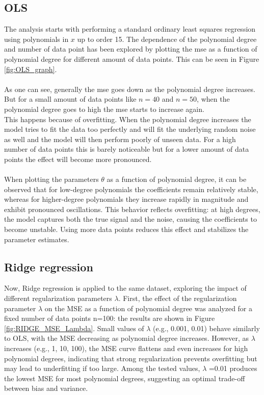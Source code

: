 \documentclass[
 reprint,            %
 amsmath,amssymb,
 aps,
]{revtex4-2}
\begin{document}
\subsection{OLS}
\label{OLS}
The analysis starts with performing a standard ordinary least squares regression using polynomials in $x$ up to order 15. The dependence of the polynomial degree and number of data point has been explored by plotting the mse as a function of polynomial degree for different amount of data points. This can be seen in Figure \ref{fig:OLS_graph}.\\\\
As one can see, generally the mse goes down as the polynomial degree increases. But for a small amount of data points like $n = 40$ and $n = 50$, when the polynomial degree goes to high the mse starts to increase again.\\
This happens because of overfitting. When the polynomial degree increases the model tries to fit the data too perfectly and will fit the underlying random noise as well and the model will then perform poorly of unseen data. For a high number of data points this is barely noticeable but for a lower amount of data points the effect will become more pronounced.\\\\
When plotting the parameters $\theta$ as a function of polynomial degree, it can be observed that for low-degree polynomials the coefficients remain relatively stable, whereas for higher-degree polynomials they increase rapidly in magnitude and exhibit pronounced oscillations.
This behavior reflects overfitting: at high degrees, the model captures both the true signal and the noise, causing the coefficients to become unstable. Using more data points reduces this effect and stabilizes the parameter estimates.
    


\subsection{Ridge regression}
\label{Ridge regression}
Now, Ridge regression is applied to the same dataset, exploring the impact of different regularization parameters $\lambda$. First, the effect of the regularization parameter $\lambda $ on the MSE as a function of polynomial degree was analyzed for a fixed number of data points n=100: the results are shown in Figure \ref{fig:RIDGE_MSE_Lambda}.
Small values of $\lambda$ (e.g., 0.001, 0.01) behave similarly to OLS, with the MSE decreasing as polynomial degree increases. However, as $\lambda$ increases (e.g., 1, 10, 100), the MSE curve flattens and even increases for high polynomial degrees, indicating that strong regularization prevents overfitting but may lead to underfitting if too large.
Among the tested values, $\lambda$ =0.01 produces the lowest MSE for most polynomial degrees, suggesting an optimal trade-off between bias and variance.
\end{document}
